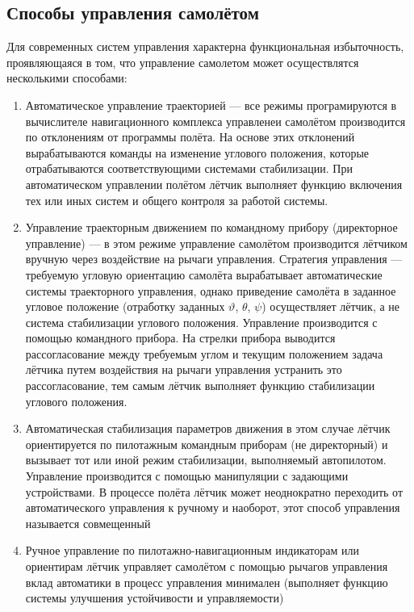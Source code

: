 \documentclass{article}
\begin{document}
\subsection{Способы управления самолётом}
Для современных систем управления характерна функциональная избыточность, проявляющаяся в том, что управление самолетом может осуществлятся несколькими способами: 
\begin{enumerate}
	\item Автоматическое управление траекторией --- все режимы програмируются в вычислителе навигационного комплекса управленеи самолётом производится по отклонениям от программы полёта. На основе этих отклонений вырабатываются команды на изменение углового положения, которые отрабатываются соответствующими системами стабилизации. При автоматическом управлении полётом лётчик выполняет функцию включения тех или иных систем и общего контроля за работой системы.
	\item Управление траекторным движением по командному прибору (директорное управление) --- в этом режиме управление самолётом производится лётчиком вручную через воздействие на рычаги управления. Стратегия управления --- требуемую угловую ориентацию самолёта вырабатывает автоматические системы траекторного управления, однако приведение самолёта в заданное угловое положение (отработку заданных $\vartheta$, $\theta$, $\psi$) осуществляет лётчик, а не система стабилизации углового положения. Управление производится с помощью командного прибора. На стрелки прибора выводится рассогласование между требуемым углом и текущим положением задача лётчика путем воздействия на рычаги управления устранить это рассогласование, тем самым лётчик выполняет функцию стабилизации углового положения.
	\item Автоматическая стабилизация параметров движения в этом случае лётчик ориентируется по пилотажным командным приборам (не директорный) и вызывает тот или иной режим стабилизации, выполняемый автопилотом. Управление производится с помощью манипуляции с задающими устройствами. В процессе полёта лётчик может неоднократно переходить от автоматического управления к ручному и наоборот, этот способ управления называется совмещенный
	\item Ручное управление по пилотажно-навигационным индикаторам или ориентирам лётчик управляет самолётом с помощью рычагов управления вклад автоматики в процесс управления минимален (выполняет функцию системы улучшения устойчивости и управляемости)
\end{enumerate}
\end{document}
